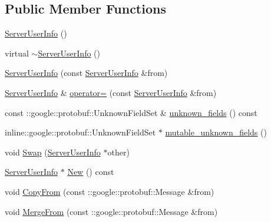 \subsection*{Public Member Functions}
\begin{DoxyCompactItemize}
\item 
\hyperlink{class_i_m_1_1_base_define_1_1_server_user_info_aae96d715d8be04c83afa66a7d1d0dac6}{Server\+User\+Info} ()
\item 
virtual \hyperlink{class_i_m_1_1_base_define_1_1_server_user_info_ad3b6774899b702ce90efc51a5b3b4c6b}{$\sim$\+Server\+User\+Info} ()
\item 
\hyperlink{class_i_m_1_1_base_define_1_1_server_user_info_a1806aa2657906092e8b601a77f32adf3}{Server\+User\+Info} (const \hyperlink{class_i_m_1_1_base_define_1_1_server_user_info}{Server\+User\+Info} \&from)
\item 
\hyperlink{class_i_m_1_1_base_define_1_1_server_user_info}{Server\+User\+Info} \& \hyperlink{class_i_m_1_1_base_define_1_1_server_user_info_a829ded67a0e71eef8b3ead3cc47fcd0b}{operator=} (const \hyperlink{class_i_m_1_1_base_define_1_1_server_user_info}{Server\+User\+Info} \&from)
\item 
const \+::google\+::protobuf\+::\+Unknown\+Field\+Set \& \hyperlink{class_i_m_1_1_base_define_1_1_server_user_info_af0f05a964a82857bec86bfb6792382ac}{unknown\+\_\+fields} () const 
\item 
inline\+::google\+::protobuf\+::\+Unknown\+Field\+Set $\ast$ \hyperlink{class_i_m_1_1_base_define_1_1_server_user_info_a5cda5df87b5de99410e23f97a8ec8d46}{mutable\+\_\+unknown\+\_\+fields} ()
\item 
void \hyperlink{class_i_m_1_1_base_define_1_1_server_user_info_ab2c535850ccc63f0b0c9882c67c4c19d}{Swap} (\hyperlink{class_i_m_1_1_base_define_1_1_server_user_info}{Server\+User\+Info} $\ast$other)
\item 
\hyperlink{class_i_m_1_1_base_define_1_1_server_user_info}{Server\+User\+Info} $\ast$ \hyperlink{class_i_m_1_1_base_define_1_1_server_user_info_a4d5661b7544403ca0deeb0a6def7484f}{New} () const 
\item 
void \hyperlink{class_i_m_1_1_base_define_1_1_server_user_info_a9700e20f3c7b11619daf9dfa18690f13}{Copy\+From} (const \+::google\+::protobuf\+::\+Message \&from)
\item 
void \hyperlink{class_i_m_1_1_base_define_1_1_server_user_info_ac93774ad8594a19384a7cd4406046b64}{Merge\+From} (const \+::google\+::protobuf\+::\+Message \&from)
\item 

\end{DoxyCompactItemize}

